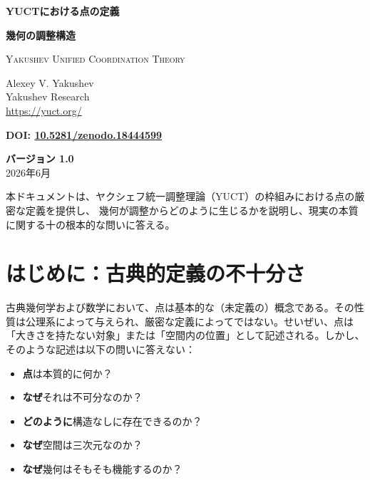 \documentclass[12pt,a4paper]{article}
\begin{document}
	
	\begin{titlepage}
		\begin{center}
			\vspace*{1.5cm}
			\Huge\textbf{YUCTにおける点の定義}
			
			\vspace{0.3cm}
			\Large\textbf{幾何の調整構造}
			
			\vspace{0.5cm}
			\large
			\textsc{Yakushev Unified Coordination Theory}
			
			\vspace{0.8cm}
			\large
			Alexey V. Yakushev \\
			Yakushev Research \\
			\url{https://yuct.org/}
			
			\vspace{0.5cm}
			\large
			\textbf{DOI: \href{https://doi.org/10.5281/zenodo.18444599}{10.5281/zenodo.18444599}}
			
			\vspace{1.5cm}
			\large
			\textbf{バージョン 1.0} \\
			2026年6月
			
			\vfill
			\normalsize
			本ドキュメントは、ヤクシェフ統一調整理論（YUCT）の枠組みにおける点の厳密な定義を提供し、
			幾何が調整からどのように生じるかを説明し、現実の本質に関する十の根本的な問いに答える。
		\end{center}
	\end{titlepage}
	
	\tableofcontents
	\newpage
	
	\section{はじめに：古典的定義の不十分さ}
	
	古典幾何学および数学において、点は基本的な（未定義の）概念である。その性質は公理系によって与えられ、厳密な定義によってではない。せいぜい、点は「大きさを持たない対象」または「空間内の位置」として記述される。しかし、そのような記述は以下の問いに答えない：
	
	\begin{itemize}
		\item \textbf{点}は本質的に何か？
		\item \textbf{なぜ}それは不可分なのか？
		\item \textbf{どのように}構造なしに存在できるのか？
		\item \textbf{なぜ}空間は三次元なのか？
		\item \textbf{なぜ}幾何はそもそも機能するのか？
	\end{itemize}
	
\end{document}
